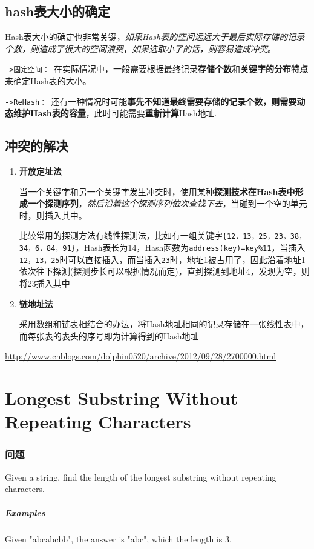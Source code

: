 \documentclass[UTF8,a4paper,12pt]{ctexbook}
\begin{document}
	\subsection{hash表大小的确定}
		Hash表大小的确定也非常关键，\textit{如果Hash表的空间远远大于最后实际存储的记录个数，则造成了很大的空间浪费}，\textit{如果选取小了的话，则容易造成冲突}。
		
		\verb|->固定空间： |在实际情况中，一般需要根据最终记录\textbf{存储个数}和\textbf{关键字的分布特点}来确定Hash表的大小。
		
		\verb|->ReHash： |还有一种情况时可能\textbf{事先不知道最终需要存储的记录个数，则需要动态维护Hash表的容量}，此时可能需要\textbf{重新计算}Hash地址.
		
	\subsection{冲突的解决}
		\begin{enumerate}
			\item \textbf{开放定址法}
			
				当一个关键字和另一个关键字发生冲突时，使用某种\textbf{探测技术在Hash表中形成一个探测序列}，\textit{然后沿着这个探测序列依次查找下去}，当碰到一个空的单元时，则插入其中。
				
				比较常用的探测方法有线性探测法，比如有一组关键字\verb|{12，13，25，23，38，34，6，84，91}|，Hash表长为14，Hash函数为\verb|address(key)=key%11|，当插入\verb|12，13，25|时可以直接插入，而当插入\verb|23|时，地址1被占用了，因此沿着地址1依次往下探测(探测步长可以根据情况而定)，直到探测到地址4，发现为空，则将23插入其中
			\item \textbf{链地址法}
			
				采用数组和链表相结合的办法，将Hash地址相同的记录存储在一张线性表中，而每张表的表头的序号即为计算得到的Hash地址
		\end{enumerate}
	\url{http://www.cnblogs.com/dolphin0520/archive/2012/09/28/2700000.html}
\section{Longest Substring Without Repeating Characters}
	\subsubsection{问题}
	Given a string, find the length of the longest substring without repeating characters.
	
	\subparagraph{Examples}		
	Given "abcabcbb", the answer is "abc", which the length is 3.
	
\end{document}
